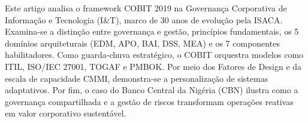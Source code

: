 \begin{abstract}
This paper analyzes the COBIT 2019 framework in corporate Information and Technology (I\&T) Governance, marking 30 years of evolution by ISACA. It examines the distinction between governance and management, core principles, 5 architectural domains (EDM, APO, BAI, DSS, MEA), and 7 governance components. Acting as a strategic umbrella, COBIT orchestrates frameworks such as ITIL, ISO/IEC 27001, TOGAF, and PMBOK. Supported by Design Factors and the CMMI capability model, it customizes adaptive governance systems. Finally, an empirical case study of the Central Bank of Nigeria (CBN) demonstrates how shared governance and integrated risk reporting transform operational firefighting into sustainable corporate value.
\end{abstract}

\begin{resumo}
Este artigo analisa o framework COBIT 2019 na Governança Corporativa de Informação e Tecnologia (I\&T), marco de 30 anos de evolução pela ISACA. Examina-se a distinção entre governança e gestão, princípios fundamentais, os 5 domínios arquiteturais (EDM, APO, BAI, DSS, MEA) e os 7 componentes habilitadores. Como guarda-chuva estratégico, o COBIT orquestra modelos como ITIL, ISO/IEC 27001, TOGAF e PMBOK. Por meio dos Fatores de Design e da escala de capacidade CMMI, demonstra-se a personalização de sistemas adaptativos. Por fim, o caso do Banco Central da Nigéria (CBN) ilustra como a governança compartilhada e a gestão de riscos transformam operações reativas em valor corporativo sustentável.
\end{resumo}

